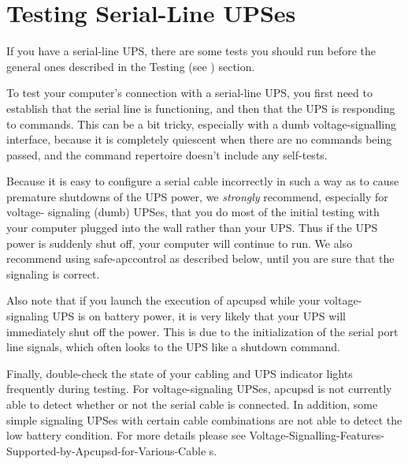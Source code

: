 {{{{{{{

\label{Testing-Serial_002dLine-UPSes}
\section*{Testing Serial-Line UPSes}

\label{index-Testing_002c-Serial-219}
\label{index-Serial_002c-Testing-220}
If you have a serial-line UPS, there are some tests you should run before the
general ones described in the Testing (see 
) section.  

To test your computer's connection with a serial-line UPS, you first need to
establish that the serial line is functioning, and then that the UPS is
responding to commands.  This can be a bit tricky, especially with a dumb
voltage-signalling interface, because it is completely quiescent when there
are no commands being passed, and the command repertoire doesn't include any
self-tests.  

Because it is easy to configure a serial cable incorrectly in such a way as to
cause premature shutdowns of the UPS power, we {\it strongly} recommend,
especially for voltage- signaling (dumb) UPSes, that you do most of the
initial testing with your computer plugged into the wall rather than your UPS.
Thus if the UPS power is suddenly shut off, your computer will continue to
run. We also recommend using safe-apccontrol as described below, until you are
sure that the signaling is correct.  

Also note that if you launch the execution of apcupsd while your
voltage-signaling UPS is on battery power, it is very likely that your UPS
will immediately shut off the power. This is due to the initialization of the
serial port line signals, which often looks to the UPS like a shutdown
command.  

Finally, double-check the state of your cabling and UPS indicator lights
frequently during testing.  For voltage-signaling UPSes, apcupsd is not
currently able to detect whether or not the serial cable is connected. In
addition, some simple signaling UPSes with certain cable combinations are not
able to detect the low battery condition.  For more details please see 
{Voltage-Signalling-Features-Supported-by-Apcupsd-for-Various-Cable%
s}. 

}}}}}}}
